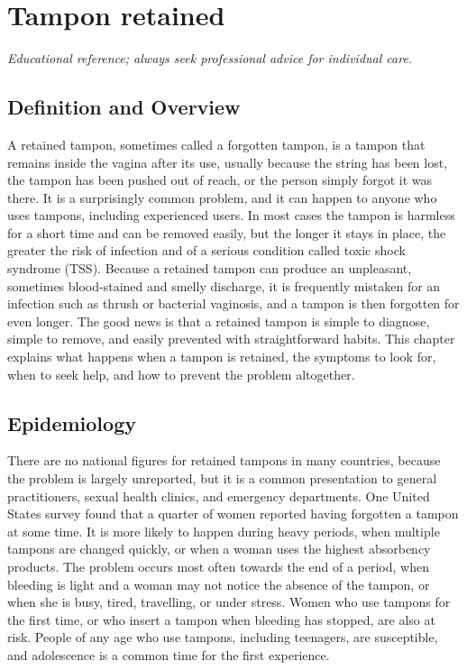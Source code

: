 \chapter{Tampon retained}

\medskip
\noindent\textit{Educational reference; always seek professional advice for individual care.}

\section*{Definition and Overview}
A retained tampon, sometimes called a forgotten tampon, is a tampon that remains inside the vagina after its use, usually because the string has been lost, the tampon has been pushed out of reach, or the person simply forgot it was there. It is a surprisingly common problem, and it can happen to anyone who uses tampons, including experienced users. In most cases the tampon is harmless for a short time and can be removed easily, but the longer it stays in place, the greater the risk of infection and of a serious condition called toxic shock syndrome (TSS). Because a retained tampon can produce an unpleasant, sometimes blood-stained and smelly discharge, it is frequently mistaken for an infection such as thrush or bacterial vaginosis, and a tampon is then forgotten for even longer. The good news is that a retained tampon is simple to diagnose, simple to remove, and easily prevented with straightforward habits. This chapter explains what happens when a tampon is retained, the symptoms to look for, when to seek help, and how to prevent the problem altogether.

\section*{Epidemiology}
There are no national figures for retained tampons in many countries, because the problem is largely unreported, but it is a common presentation to general practitioners, sexual health clinics, and emergency departments. One United States survey found that a quarter of women reported having forgotten a tampon at some time. It is more likely to happen during heavy periods, when multiple tampons are changed quickly, or when a woman uses the highest absorbency products. The problem occurs most often towards the end of a period, when bleeding is light and a woman may not notice the absence of the tampon, or when she is busy, tired, travelling, or under stress. Women who use tampons for the first time, or who insert a tampon when bleeding has stopped, are also at risk. People of any age who use tampons, including teenagers, are susceptible, and adolescence is a common time for the first experience.


